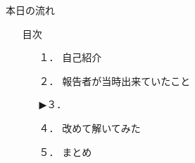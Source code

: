 \begin{frame}{本日の流れ}
  \begin{itemize}
      \item[] 目次
      \begin{itemize}[itemsep=1.3ex, leftmargin=1cm]
        \item[１．] {\color{cud_lightgray} 自己紹介}
        \item[２．] {\color{cud_lightgray} 報告者が当時出来ていたこと}
        \item[▶３．] 
        \item[４．] 改めて解いてみた
        \item[５．] まとめ
     \end{itemize}
  \end{itemize}
\end{frame}

